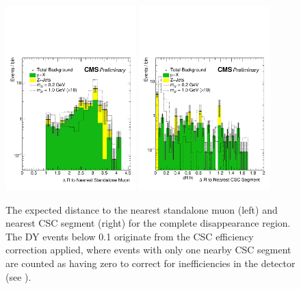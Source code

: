 \begin{figure}[htbp]
	\centering
	\includegraphics[width=0.45\textwidth]{figures/totDisappStaDr.pdf}
	\hspace{0.01\textwidth}
	\includegraphics[width=0.45\textwidth]{figures/totDisappCscDr.pdf}
	\caption[Expected Complete Disappearance Muon Chamber Features]{The expected distance to the nearest standalone muon (left) and nearest CSC segment (right) for the complete disappearance region. The DY events below 0.1 originate from the CSC efficiency correction applied, where events with only one nearby CSC segment are counted as having zero to correct for inefficiencies in the detector (see ).}
	\label{fig:totCSCStaDr}
\end{figure}

